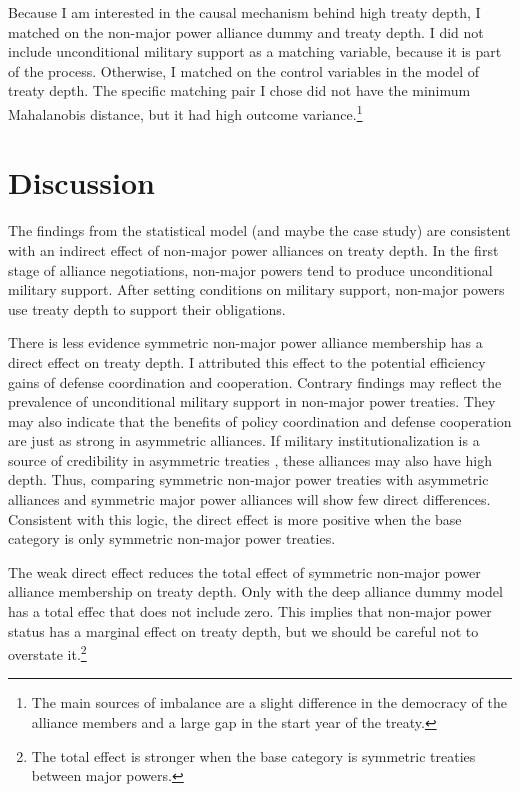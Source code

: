 \documentclass[12pt]{article}
\begin{document}
Because I am interested in the causal mechanism behind high treaty depth, I matched on the non-major power alliance dummy and treaty depth. 
I did not include unconditional military support as a matching variable, because it is part of the process. 
Otherwise, I matched on the control variables in the model of treaty depth. 
The specific matching pair I chose did not have the minimum Mahalanobis distance, but it had high outcome variance.\footnote{The main sources of imbalance are a slight difference in the democracy of the alliance members and a large gap in the start year of the treaty.} 


\section{Discussion}


The findings from the statistical model (and maybe the case study) are consistent with an indirect effect of non-major power alliances on treaty depth. 
In the first stage of alliance negotiations, non-major powers tend to produce unconditional military support. 
After setting conditions on military support, non-major powers use treaty depth to support their obligations. 


There is less evidence symmetric non-major power alliance membership has a direct effect on treaty depth.
I attributed this effect to the potential efficiency gains of defense coordination and cooperation.  
Contrary findings may reflect the prevalence of unconditional military support in non-major power treaties. 
They may also indicate that the benefits of policy coordination and defense cooperation are just as strong in asymmetric alliances. 
If military institutionalization is a source of credibility in asymmetric treaties \citep{Mattes2012}, these alliances may also have high depth. 
Thus, comparing symmetric non-major power treaties with asymmetric alliances and symmetric major power alliances will show few direct differences.
Consistent with this logic, the direct effect is more positive when the base category is only symmetric non-major power treaties.  


The weak direct effect reduces the total effect of symmetric non-major power alliance membership on treaty depth. 
Only with the deep alliance dummy model has a total effec that does not include zero. 
This implies that non-major power status has a marginal effect on treaty depth, but we should be careful not to overstate it.\footnote{The total effect is stronger when the base category is symmetric treaties between major powers.}
\end{document}
